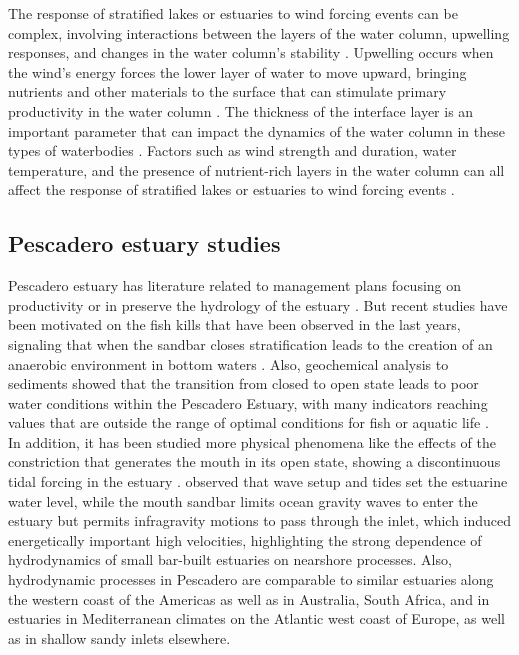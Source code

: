 \documentclass[tesis.tex]{subfiles}
\begin{document}
The response of stratified lakes or estuaries to wind forcing events can be complex, involving interactions between the layers of the water column, upwelling responses, and changes in the water column's stability \citep{jayaweera2019turbulent}. Upwelling occurs when the wind's energy forces the lower layer of water to move upward, bringing nutrients and other materials to the surface that can stimulate primary productivity in the water column \citep{bastidas2021comparison}. The thickness of the interface layer is an important parameter that can impact the dynamics of the water column in these types of waterbodies \citep{xu2017vertical}. Factors such as wind strength and duration, water temperature, and the presence of nutrient-rich layers in the water column can all affect the response of stratified lakes or estuaries to wind forcing events \citep{nidheesh2018stratification}.\\

\subsection{Pescadero estuary studies}

Pescadero estuary has literature related to management plans focusing on productivity \citep{curry1985pescadero} or in preserve the hydrology of the estuary \citep{williams1990pescadero}. But recent studies have been motivated on the fish kills that have been observed in the last years, signaling that when the sandbar closes stratification leads to the creation of an anaerobic environment in bottom waters \citep{sloan2006ecological}. Also, geochemical analysis to sediments showed that the transition from closed to open state leads to poor water conditions within the Pescadero Estuary, with many indicators reaching values that are outside the range of optimal conditions for fish or aquatic life \citep{richards2018}. \\

In addition, it has been studied more physical phenomena like the effects of the constriction that generates the mouth in its open state, showing a discontinuous tidal forcing in the estuary \citep{williams2016}. \cite{williams2016} observed that wave setup and tides set the estuarine water level, while the mouth sandbar limits ocean gravity waves to enter the estuary but permits infragravity motions to pass through the inlet, which induced energetically important high velocities, highlighting the strong dependence of hydrodynamics of small bar-built estuaries on nearshore processes. Also, hydrodynamic processes in Pescadero are comparable to similar estuaries along the western coast of the Americas as well as in Australia, South Africa, and in estuaries in Mediterranean climates on the Atlantic west coast of Europe, as well as in shallow sandy inlets elsewhere.\\
\end{document}
